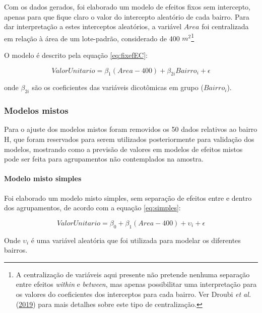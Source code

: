 \documentclass[
  a4paper, 11pt]{article}
\begin{document}
Com os dados gerados, foi elaborado um modelo de efeitos fixos sem
intercepto, apenas para que fique claro o valor do intercepto aleatório
de cada bairro. Para dar interpretação a estes interceptos aleatórios, a
variável \(Area\) foi centralizada em relação à área de um lote-padrão,
considerado de 400 \(m^2\)\footnote{A centralização de variáveis aqui
  presente não pretende nenhuma separação entre efeitos \emph{within} e
  \emph{between}, mas apenas possibilitar uma interpretação para os
  valores do coeficientes dos interceptos para cada bairro. Ver Droubi
  \emph{et al.} (\protect\hyperlink{ref-droubi2019}{2019}) para mais
  detalhes sobre este tipo de centralização.}

O modelo é descrito pela equação \ref{eq:fixefEC}:

\begin{equation} \label{eq:fixefEC}
ValorUnitario = \beta_1 (Area - 400) + \beta_{2i}Bairro_i + \epsilon
\end{equation}

onde \(\beta_{2i}\) são os coeficientes das variáveis dicotômicas em
grupo (\(Bairro_i\)).

\hypertarget{modelos-mistos}{%
\subsubsection{Modelos mistos}\label{modelos-mistos}}

Para o ajuste dos modelos mistos foram removidos os 50 dados relativos
ao bairro H, que foram reservados para serem utilizados posteriormente
para validação dos modelos, mostrando como a previsão de valores em
modelos de efeitos mistos pode ser feita para agrupamentos não
contemplados na amostra.

\hypertarget{modelo-misto-simples}{%
\paragraph{Modelo misto simples}\label{modelo-misto-simples}}

Foi elaborado um modelo misto simples, sem separação de efeitos entre e
dentro dos agrupamentos, de acordo com a equação \ref{eq:simples}:

\begin{equation} \label{eq:simples}
ValorUnitario = \beta_0 + \beta_1 (Area - 400) + \upsilon_i + \epsilon
\end{equation}

Onde \(\upsilon_i\) é uma variável aleatória que foi utilizada para
modelar os diferentes bairros.
\end{document}
